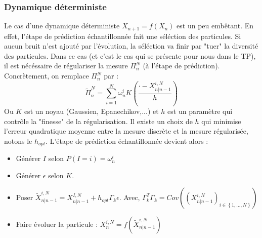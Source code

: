 \documentclass{article}
\begin{document}
\subsubsection{Dynamique déterministe}
Le cas d'une dynamique déterministe $X_{n+1}=f(X_n)$ est un peu embêtant. En effet, l'étape de prédiction
échantillonnée fait une séléction des particules. Si aucun bruit n'est ajouté par l'évolution, la séléction va finir par "tuer" la diversité des particules. 
Dans ce cas (et c'est le cas qui se présente pour nous dans le TP), il est nécéssaire de régulariser la mesure $\Pi_n^N$ (à l'étape de prédiction).
Concrètement, on remplace $\Pi_n^N$ par :
\[\tilde{\Pi}_n^N=\sum_{i=1}^N \omega_n^i K\left(\frac{\boldsymbol{\cdot}-X_{n \vert n-1}^{i,N}}{h}\right) \]  
Ou $K$ est un noyau (Gaussien, Epanechikov,...) et $h$ est un paramètre qui contrôle la "finesse" de la régularisation. Il existe un choix de $h$ qui minimise l'erreur quadratique moyenne entre la mesure discrète et la mesure régularisée, notons le $h_{opt}$.
\newline
L'étape de prédiction échantillonnée devient alors : 
\begin{itemize}
   \item Générer $I$ selon $P(I=i)=\omega^i_n$
   \item Générer $\epsilon$ selon $K$.
   \item Poser $\tilde{X}^{i,N}_{n \vert n-1}=X^{I,N}_{n \vert n-1} + h_{opt}\Gamma_k \epsilon$. Avec, $\Gamma_k^{T}\Gamma_k=Cov\left((X_{n \vert n-1}^{i,N})_{i\in \left\{1,...,N\right\}}\right) $
   \item Faire évoluer la particule : $ X_{n}^{i,N}= f(\tilde{X}^{i,N}_{n \vert n-1})$
\end{itemize}
\end{document}
